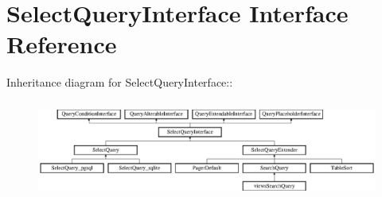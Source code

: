 \hypertarget{interfaceSelectQueryInterface}{
\section{SelectQueryInterface Interface Reference}
\label{interfaceSelectQueryInterface}
}
Inheritance diagram for SelectQueryInterface::\begin{figure}[H]
\begin{center}
\leavevmode
\includegraphics[height=3.21839cm]{interfaceSelectQueryInterface}
\end{center}
\end{figure}
